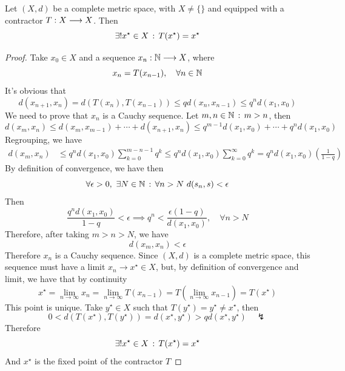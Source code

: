 \documentclass[../complete.tex]{subfiles}
\begin{document}
\begin{thm}
	Let $(X,d)$ be a complete metric space, with $X\ne\{\}$ and equipped with a contractor $T:X\overset{}{\longrightarrow} X$. Then
	\begin{equation}
		\exists!x^{\star}\in X\, :\,  T(x^\star)=x^\star
		\label{eq:fixedpointbanach}
	\end{equation}
\end{thm}
\begin{proof}
	Take $x_0\in X$ and a sequence $x_n:\mathbb{N}\overset{}{\longrightarrow} X$, where
	\begin{equation*}
		x_n=T(x_{n-1}),\quad\forall n\in\mathbb{N}
	\end{equation*}
	It's obvious that
	\begin{equation*}
		d(x_{n+1},x_{n})=d(T(x_{n}),T(x_{n-1}))\le qd(x_n,x_{n-1})\le q^nd(x_1,x_0)
	\end{equation*}
	We need to prove that $x_n$ is a Cauchy sequence. Let $m,n\in\mathbb{N}\, :\,  m>n$, then
	\begin{equation*}
		d(x_m,x_n)\le d(x_m,x_{m-1})+\cdots+d(x_{n+1},x_n)\le q^{m-1}d(x_1,x_0)+\cdots+q^nd(x_1,x_0)
	\end{equation*}
	Regrouping, we have
	\begin{equation*}
		\begin{aligned}
			d(x_m,x_n)&\le q^nd(x_1,x_0)\sum_{k=0}^{m-n-1}q^k\le q^nd(x_1,x_0)\sum_{k=0}^{\infty}q^k=q^nd(x_1,x_0)\left( \frac{1}{1-q} \right)
		\end{aligned}
	\end{equation*}
	By definition of convergence, we have then
	\begin{equation*}
		\forall\epsilon>0,\ \exists N\in\mathbb{N}\, :\, \forall n>N\ d(s_n,s)<\epsilon
	\end{equation*}
	Then
	\begin{equation*}
		\frac{q^nd(x_1,x_0)}{1-q}<\epsilon\implies{} q^n<\frac{\epsilon(1-q)}{d(x_1,x_0)},\quad\forall n>N
	\end{equation*}
	Therefore, after taking $m>n>N$, we have
	\begin{equation*}
		d(x_m,x_n)<\epsilon
	\end{equation*}
	Therefore $x_n$ is a Cauchy sequence. Since $(X,d)$ is a complete metric space, this sequence must have a limit $x_n\to x^\star\in X$, but, by definition of convergence and limit, we have that by continuity
	\begin{equation*}
		x^\star=\lim_{n\to\infty}x_n=\lim_{n\to\infty}T(x_{n-1})=T\left( \lim_{n\to\infty}x_{n-1} \right)=T(x^\star)
	\end{equation*}
	This point is unique. Take $y^\star\in X$ such that $T(y^\star)=y^\star\ne x^\star$, then
	\begin{equation*}
		0<d(T(x^\star),T(y^\star))=d(x^\star,y^\star)>qd(x^\star,y^\star)\quad\lightning
	\end{equation*}
	Therefore
	\begin{equation*}
		\exists!x^\star\in X\, :\,  T(x^\star)=x^\star
	\end{equation*}
	And $x^\star$ is the fixed point of the contractor $T$
\end{proof}
\end{document}
